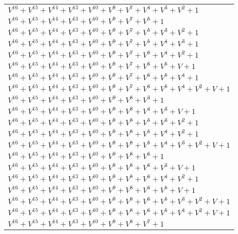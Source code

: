 \documentclass[12pt]{article}
\begin{document}
\begin{adjustwidth}{-4cm}{}
\begin{center}
\begin{longtable}{|l|}
$V^{16}  +V^{15}  +V^{14}  +V^{13}  +V^{10}  +V^{9}  +V^{7}  +V^{4}  +V^{3}  +V^{2}  + 1$ \\
$V^{16}  +V^{15}  +V^{14}  +V^{13}  +V^{10}  +V^{9}  +V^{7}  +V^{5}  + 1$ \\
$V^{16}  +V^{15}  +V^{14}  +V^{13}  +V^{10}  +V^{9}  +V^{7}  +V^{5}  +V^{3}  +V^{2}  + 1$ \\
$V^{16}  +V^{15}  +V^{14}  +V^{13}  +V^{10}  +V^{9}  +V^{7}  +V^{5}  +V^{4}  +V^{3}  + 1$ \\
$V^{16}  +V^{15}  +V^{14}  +V^{13}  +V^{10}  +V^{9}  +V^{7}  +V^{6}  +V^{4}  +V^{2}  + 1$ \\
$V^{16}  +V^{15}  +V^{14}  +V^{13}  +V^{10}  +V^{9}  +V^{7}  +V^{6}  +V^{5}  + V + 1$ \\
$V^{16}  +V^{15}  +V^{14}  +V^{13}  +V^{10}  +V^{9}  +V^{7}  +V^{6}  +V^{5}  +V^{4}  + 1$ \\
$V^{16}  +V^{15}  +V^{14}  +V^{13}  +V^{10}  +V^{9}  +V^{7}  +V^{6}  +V^{5}  +V^{4}  +V^{2}  + V + 1$ \\
$V^{16}  +V^{15}  +V^{14}  +V^{13}  +V^{10}  +V^{9}  +V^{8}  +V^{3}  + 1$ \\
$V^{16}  +V^{15}  +V^{14}  +V^{13}  +V^{10}  +V^{9}  +V^{8}  +V^{4}  +V^{3}  + V + 1$ \\
$V^{16}  +V^{15}  +V^{14}  +V^{13}  +V^{10}  +V^{9}  +V^{8}  +V^{5}  +V^{3}  +V^{2}  + 1$ \\
$V^{16}  +V^{15}  +V^{14}  +V^{13}  +V^{10}  +V^{9}  +V^{8}  +V^{5}  +V^{4}  +V^{2}  + 1$ \\
$V^{16}  +V^{15}  +V^{14}  +V^{13}  +V^{10}  +V^{9}  +V^{8}  +V^{5}  +V^{4}  +V^{3}  +V^{2}  + V + 1$ \\
$V^{16}  +V^{15}  +V^{14}  +V^{13}  +V^{10}  +V^{9}  +V^{8}  +V^{6}  + 1$ \\
$V^{16}  +V^{15}  +V^{14}  +V^{13}  +V^{10}  +V^{9}  +V^{8}  +V^{6}  +V^{3}  + V + 1$ \\
$V^{16}  +V^{15}  +V^{14}  +V^{13}  +V^{10}  +V^{9}  +V^{8}  +V^{6}  +V^{4}  +V^{2}  + 1$ \\
$V^{16}  +V^{15}  +V^{14}  +V^{13}  +V^{10}  +V^{9}  +V^{8}  +V^{6}  +V^{5}  + V + 1$ \\
$V^{16}  +V^{15}  +V^{14}  +V^{13}  +V^{10}  +V^{9}  +V^{8}  +V^{6}  +V^{5}  +V^{3}  +V^{2}  + V + 1$ \\
$V^{16}  +V^{15}  +V^{14}  +V^{13}  +V^{10}  +V^{9}  +V^{8}  +V^{6}  +V^{5}  +V^{4}  +V^{2}  + V + 1$ \\
$V^{16}  +V^{15}  +V^{14}  +V^{13}  +V^{10}  +V^{9}  +V^{8}  +V^{7}  + 1$ \\

\end{longtable}
\end{center}
\end{adjustwidth}
\end{document}
